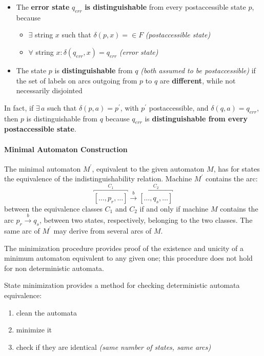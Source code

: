 \documentclass[english]{article}
\begin{document}
\begin{itemize}[label=\(\Rightarrow\)]
  \item The \textbf{error state} \(q_\textit{err}\) \textbf{is distinguishable} from every postaccessible state \(p\), because
        \begin{itemize}
          \item \(\exists\) string \(x\) such that \(\delta(p, x) = \in F\) \textit{(postaccessible state)}
          \item \(\forall\) string \(x: \delta(q_\textit{err}, x) = q_\textit{err}\) \textit{(error state)}
        \end{itemize}
  \item The state \(p\) is \textbf{distinguishable} from \(q\) \textit{(both assumed to be postaccessible)} if the set of labels on arcs outgoing from \(p\) to \(q\) are \textbf{different}, while not necessarily disjointed
\end{itemize}

In fact, if \(\exists \, a\) such that \(\delta(p, a) = p^\prime\), with \(p^\prime\) postaccessible, and \(\delta(q, a) = q_\textit{err}\), then \(p\) is distinguishable from \(q\) because \(q_\textit{err}\) is \textbf{distinguishable from every postaccessible state}.

\paragraph{Minimal Automaton Construction}

The minimal automaton \(M^\prime\), equivalent to the given automaton \(M\), has for states the equivalence of the indistinguishability relation.
Machine \(M^\prime\) contains the arc:
\[ \overbracket{\left[ \ldots, p_r, \ldots  \right]}^{C_1} \xrightarrow{b} \overbracket{\left[ \ldots, q_s, \ldots  \right]}^{C_2} \]
between the equivalence classes \(C_1\) and \(C_2\) if and only if machine \(M\) contains the arc \(p_r \xrightarrow{b} q_s\), between two states, respectively, belonging to the two classes.
The same arc of \(M^\prime\) may derive from several arcs of \(M\).

The minimization procedure provides proof of the existence and unicity of a minimum automaton equivalent to any given one;
this procedure does not hold for non deterministic automata.

State minimization provides a method for checking deterministic automata equivalence:

\begin{enumerate}
  \item clean the automata
  \item minimize it
  \item check if they are identical \textit{(same number of states, same arcs)}
\end{enumerate}
\end{document}

